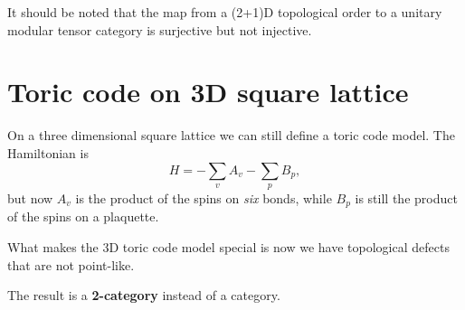 \documentclass[hyperref, a4paper]{article}
\newcommand*{\concept}[1]{{\textbf{#1}}}
\begin{document}
It should be noted that the map from a (2+1)D topological order to a unitary modular tensor category is surjective but not injective.

\section{Toric code on 3D square lattice}

On a three dimensional square lattice we can still define a toric code model. The Hamiltonian is 
\begin{equation}
    H = - \sum_v A_v - \sum_p B_p,
\end{equation}
but now $A_v$ is the product of the spins on \emph{six} bonds, while $B_p$ is still the product of the spins on a plaquette.

What makes the 3D toric code model special is now we have topological defects that are not point-like.

The result is a \concept{2-category} instead of a category.
\end{document}
